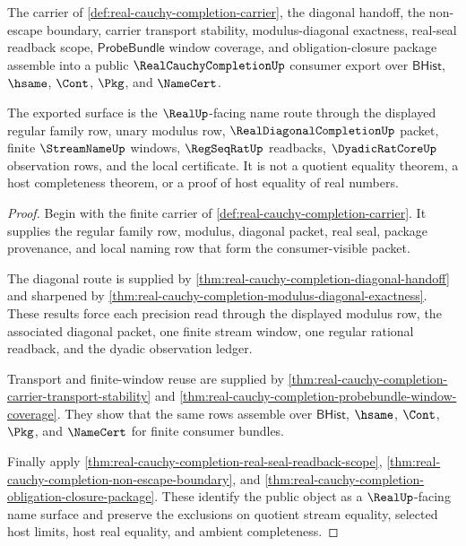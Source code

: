 \begin{theorem}
\label{thm:real-cauchy-completion-public-real-name-export}
The carrier of \autoref{def:real-cauchy-completion-carrier}, the diagonal handoff, the non-escape boundary, carrier transport stability, modulus-diagonal exactness, real-seal readback scope, $\mathsf{ProbeBundle}$ window coverage, and obligation-closure package assemble into a public $\RealCauchyCompletionUp$ consumer export over $\mathsf{BHist}$, $\hsame$, $\Cont$, $\Pkg$, and $\NameCert$.

The exported surface is the $\RealUp$-facing name route through the displayed regular family row, unary modulus row, $\RealDiagonalCompletionUp$ packet, finite $\StreamNameUp$ windows, $\RegSeqRatUp$ readbacks, $\DyadicRatCoreUp$ observation rows, and the local certificate. It is not a quotient equality theorem, a host completeness theorem, or a proof of host equality of real numbers.
\end{theorem}
\begin{proof}
Begin with the finite carrier of \autoref{def:real-cauchy-completion-carrier}. It supplies the regular family row, modulus, diagonal packet, real seal, package provenance, and local naming row that form the consumer-visible packet.

The diagonal route is supplied by \autoref{thm:real-cauchy-completion-diagonal-handoff} and sharpened by \autoref{thm:real-cauchy-completion-modulus-diagonal-exactness}. These results force each precision read through the displayed modulus row, the associated diagonal packet, one finite stream window, one regular rational readback, and the dyadic observation ledger.

Transport and finite-window reuse are supplied by \autoref{thm:real-cauchy-completion-carrier-transport-stability} and \autoref{thm:real-cauchy-completion-probebundle-window-coverage}. They show that the same rows assemble over $\mathsf{BHist}$, $\hsame$, $\Cont$, $\Pkg$, and $\NameCert$ for finite consumer bundles.

Finally apply \autoref{thm:real-cauchy-completion-real-seal-readback-scope}, \autoref{thm:real-cauchy-completion-non-escape-boundary}, and \autoref{thm:real-cauchy-completion-obligation-closure-package}. These identify the public object as a $\RealUp$-facing name surface and preserve the exclusions on quotient stream equality, selected host limits, host real equality, and ambient completeness.
\end{proof}

